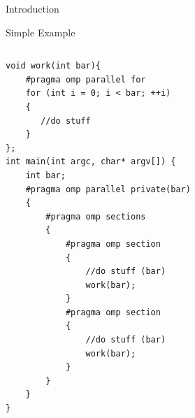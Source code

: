 \documentclass[xcolor=dvipsnames]{beamer}
\begin{document}
\begin{section}{Introduction}
\begin{frame}{\hskip 0.3cm }
\end{frame}









\begin{frame}[fragile]{\hskip 0.3cm Simple Example}

\begin{columns}

\begin{column}{5cm}
\begin{lstlisting}[language=CCC]
void work(int bar){
    #pragma omp parallel for
    for (int i = 0; i < bar; ++i)
    {
       //do stuff
    }  
};
int main(int argc, char* argv[]) {
    int bar;
    #pragma omp parallel private(bar)
    {
        #pragma omp sections
        {
            #pragma omp section
            {   
                //do stuff (bar)
                work(bar);
            }
            #pragma omp section
            {
                //do stuff (bar)
                work(bar);
            }
        }
    }
}
\end{lstlisting}

\end{column}

\begin{column}{6.5cm}
\vskip -1cm
\begin{figure}


\end{figure}
\end{column}
\end{columns}
\end{frame}
\end{section}
\end{document}
